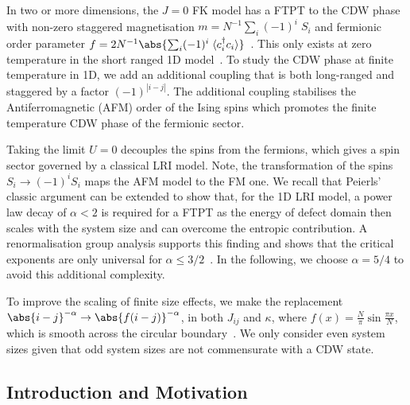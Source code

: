 In two or more dimensions, the \(J\!=0\!\) FK model has a FTPT to the CDW phase with non-zero staggered magnetisation \(m = N^{-1} \sum_i (-1)^i \; S_i\) and fermionic order parameter \(f = 2 N^{-1}\abs{\sum_i (-1)^i \; \expval{c^\dag_{i}c_{i}}}\)~\autocite{antipovInteractionTunedAndersonMott2016,maskaThermodynamicsTwodimensionalFalicovKimball2006}. This only exists at zero temperature in the short ranged 1D model~\autocite{kennedyItinerantElectronModel1986}. To study the CDW phase at finite temperature in 1D, we add an additional coupling that is both long-ranged and staggered by a factor \((-1)^{|i-j|}\). The additional coupling stabilises the Antiferromagnetic (AFM) order of the Ising spins which promotes the finite temperature CDW phase of the fermionic sector.

Taking the limit \(U = 0\) decouples the spins from the fermions, which gives a spin sector governed by a classical LRI model. Note, the transformation of the spins \(S_i \to (-1)^{i} S_i\) maps the AFM model to the FM one. We recall that Peierls' classic argument can be extended to show that, for the 1D LRI model, a power law decay of \(\alpha < 2\) is required for a FTPT as the energy of defect domain then scales with the system size and can overcome the entropic contribution. A renormalisation group analysis supports this finding and shows that the critical exponents are only universal for \(\alpha \leq 3/2\)~\autocite{ruelleStatisticalMechanicsOnedimensional1968,thoulessLongRangeOrderOneDimensional1969,angeliniRelationsShortrangeLongrange2014}. In the following, we choose \(\alpha = 5/4\) to avoid this additional complexity.

To improve the scaling of finite size effects, we make the replacement \(\abs{i - j}^{-\alpha} \rightarrow \abs{f(i - j)}^{-\alpha}\), in both \(J_{ij}\) and \(\kappa\), where \(f(x) = \frac{N}{\pi}\sin \frac{\pi x}{N}\), which is smooth across the circular boundary~\autocite{fukuiOrderNClusterMonte2009}. We only consider even system sizes given that odd system sizes are not commensurate with a CDW state.

\begin{Shaded}
\begin{Highlighting}[]

\end{Highlighting}
\end{Shaded}

\hypertarget{introduction-and-motivation}{%
\subsection{Introduction and Motivation}\label{introduction-and-motivation}}

